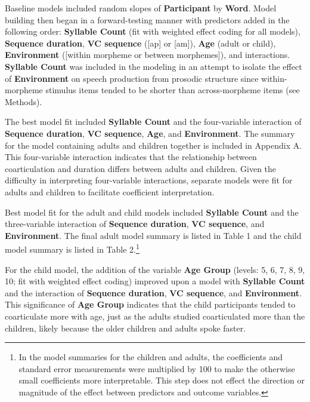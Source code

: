 \documentclass[
]{article}
\begin{document}
Baseline models included random slopes of \textbf{Participant} by \textbf{Word}. Model building then began in a forward-testing manner with predictors added in the following order: \textbf{Syllable Count} (fit with weighted effect coding for all models), \textbf{Sequence duration}, \textbf{VC sequence} ({[}ap{]} or {[}am{]}), \textbf{Age} (adult or child), \textbf{Environment} ({[}within morpheme or between morphemes{]}), and interactions. \textbf{Syllable Count} was included in the modeling in an attempt to isolate the effect of \textbf{Environment} on speech production from prosodic structure since within-morpheme stimulus items tended to be shorter than across-morpheme items (see Methods).

The best model fit included \textbf{Syllable Count} and the four-variable interaction of \textbf{Sequence duration}, \textbf{VC sequence}, \textbf{Age}, and \textbf{Environment}. The summary for the model containing adults and children together is included in Appendix A. This four-variable interaction indicates that the relationship between coarticulation and duration differs between adults and children. Given the difficulty in interpreting four-variable interactions, separate models were fit for adults and children to facilitate coefficient interpretation.

Best model fit for the adult and child models included \textbf{Syllable Count} and the three-variable interaction of \textbf{Sequence duration}, \textbf{VC sequence}, and \textbf{Environment}. The final adult model summary is listed in Table 1 and the child model summary is listed in Table 2.\footnote{In the model summaries for the children and adults, the coefficients and standard error measurements were multiplied by 100 to make the otherwise small coefficients more interpretable. This step does not effect the direction or magnitude of the effect between predictors and outcome variables.}

For the child model, the addition of the variable \textbf{Age Group} (levels: 5, 6, 7, 8, 9, 10; fit with weighted effect coding) improved upon a model with \textbf{Syllable Count} and the interaction of \textbf{Sequence duration}, \textbf{VC sequence}, and \textbf{Environment}. This significance of \textbf{Age Group} indicates that the child participants tended to coarticulate more with age, just as the adults studied coarticulated more than the children, likely because the older children and adults spoke faster.
\end{document}
